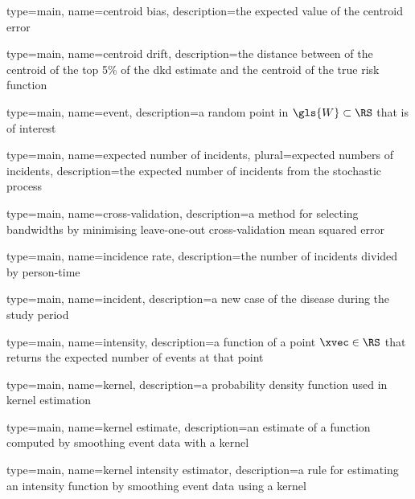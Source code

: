 

{%
   type=main,
   name={centroid bias},
   description={the expected value of the centroid error}
}

{%
   type=main,
   name={centroid drift},
   description={the distance between of the centroid of the top 5\% of the dkd estimate and the centroid of the true risk function}
}

{%
   type=main,
   name={event},
   description={a random point in $\gls{W} \subset \RS$ that is of interest}
}

{%
   type=main,
   name={expected number of incidents},
   plural={expected numbers of incidents},
   description={the expected number of incidents from the stochastic process}
}

{%
   type=main,
   name={cross-validation},
   description={a method for selecting bandwidths by minimising leave-one-out cross-validation mean squared error}
}

{
   type=main,
   name={incidence rate},
   description={the number of incidents divided by person-time}
}

{
   type=main,
   name={incident},
   description={a new case of the disease during the study period}
}

{
   type=main,
   name={intensity},
   description={a function of a point $\xvec \in \RS$ that returns the expected number of events at that point}
}

{
   type=main,
   name={kernel},
   description={a probability density function used in kernel estimation}
}

{
   type=main,
   name={kernel estimate},
   description={an estimate of a function computed by smoothing event data with a kernel}
}

{
   type=main,
   name={kernel intensity estimator},
   description={a rule for estimating an intensity function by smoothing event data using a kernel}
}

